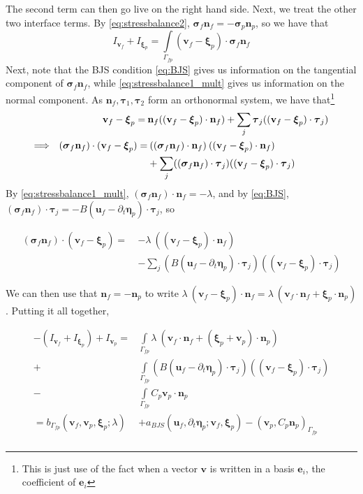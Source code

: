 \documentclass{article}
\newcommand{\mathspace}[1]{\ensuremath{#1}\xspace} %
\newcommand{\sigmabf}{\mathspace{\boldsymbol{\sigma}}}
\newcommand{\inner}[2]{\mathspace{\left (#1, #2 \right)}}
\newcommand{\ddt}[1]{\mathspace{\partial_t #1}}
\newcommand{\taubf}{\mathspace{\boldsymbol{\tau}}}
\newcommand{\interface}{\mathspace{\Gamma_{fp}}}
\newcommand{\nf}{\mathspace{\mathbf{n}_f}}
\newcommand{\np}{\mathspace{\mathbf{n}_p}}
\newcommand{\intI}{\mathspace{\int \limits_{\interface}}}
\newcommand{\uf}{\mathspace{\mathbf{u}_f}}
\newcommand{\vf}{\mathspace{\mathbf{v}_f}}
\newcommand{\vp}{\mathspace{\mathbf{v}_p}}
\newcommand{\disp}{\mathspace{\boldsymbol{\eta}_p}}
\newcommand{\disptest}{\mathspace{\boldsymbol{\xi}_p}}
\begin{document}
The second term can then go live on the right hand side. Next, we treat the other two interface terms. By \eqref{eq:stressbalance2}, $\sigmabf_f \nf = - \sigmabf_p \np$, so we have that $$I_{\vf} + I_{\disptest} = \intI (\vf - \disptest) \cdot \sigmabf_f \nf$$
Next, note that the BJS condition \eqref{eq:BJS} gives us information on the tangential component of $\sigmabf_f \nf$, while \eqref{eq:stressbalance1_mult} gives us information on the normal component. As $\nf, \taubf_1, \taubf_2$ form an orthonormal system, we have that\footnote{This is just use of the fact when a vector $\mathbf{v}$ is written in a basis $\mathbf{e}_i$, the coefficient of $\mathbf{e}_i$    }
\begin{align*}
  \vf - \disptest = \: &\nf ((\vf - \disptest) \cdot \nf) + \sum_j \taubf_j ((\vf - \disptest) \cdot \taubf_j) \\
  \Longrightarrow \hspace{0.02\textwidth}  (\sigmabf_f \nf) \cdot (\vf - \disptest) = & \: ((\sigmabf_f \nf) \cdot \nf) \: ((\vf - \disptest) \cdot \nf) \\
  & + \sum_j ((\sigmabf_f \nf) \cdot \taubf_j) ((\vf - \disptest) \cdot \taubf_j)
\end{align*}
By \eqref{eq:stressbalance1_mult}, $(\sigmabf_f \nf) \cdot \nf = -\lambda$, and by \eqref{eq:BJS}, $(\sigmabf_f \nf) \cdot \taubf_j = -B \left ( \uf - \ddt{\disp} \right ) \cdot \taubf_j$, so

\begin{align*}
(\sigmabf_f \nf) \cdot (\vf - \disptest) =  \: &-\lambda\:  ((\vf - \disptest) \cdot \nf) \\
  &- \sum_j \left (B \left ( \uf - \ddt{\disp} \right ) \cdot \taubf_j \right ) ((\vf - \disptest) \cdot \taubf_j)
\end{align*}

We can then use that $\nf = - \np$ to write $\lambda \: (\vf - \disptest) \cdot \nf = \lambda \: (\vf  \cdot \nf + \disptest \cdot \np)$.
Putting it all together,

\begin{align*}
  -(I_{\vf} + I_{\disptest}) + I_{\vp}  =& \intI \lambda\: (\vf  \cdot \nf + (\disptest + \vp) \cdot \np) \\
  + &\intI \left (B \left ( \uf - \ddt{\disp} \right ) \cdot \taubf_j \right ) ((\vf - \disptest) \cdot \taubf_j) \\
  - &\intI C_p \vp \cdot \np \\
  = b_{\interface}\left (\vf, \vp, \disptest; \lambda \right ) & + a_{BJS}\left (\uf, \ddt{\disp}; \vf, \disptest \right) - \inner{\vp}{C_p\np}_{\interface} \\
\end{align*}
\end{document}
